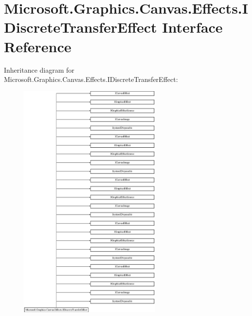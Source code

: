 \hypertarget{interface_microsoft_1_1_graphics_1_1_canvas_1_1_effects_1_1_i_discrete_transfer_effect}{}\section{Microsoft.\+Graphics.\+Canvas.\+Effects.\+I\+Discrete\+Transfer\+Effect Interface Reference}
\label{interface_microsoft_1_1_graphics_1_1_canvas_1_1_effects_1_1_i_discrete_transfer_effect}
Inheritance diagram for Microsoft.\+Graphics.\+Canvas.\+Effects.\+I\+Discrete\+Transfer\+Effect\+:\begin{figure}[H]
\begin{center}
\leavevmode
\includegraphics[height=12.000000cm]{interface_microsoft_1_1_graphics_1_1_canvas_1_1_effects_1_1_i_discrete_transfer_effect}
\end{center}
\end{figure}
